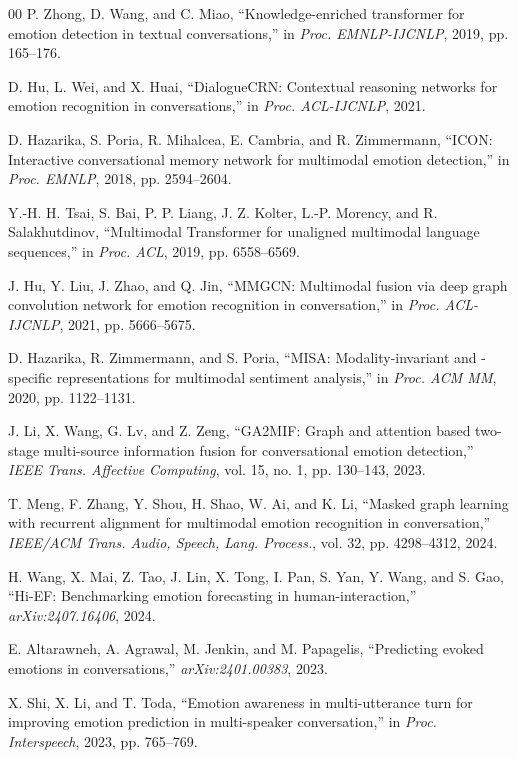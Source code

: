 \documentclass{ieeeaccess}
\begin{document}
\begin{thebibliography}{00}
 P. Zhong, D. Wang, and C. Miao, ``Knowledge-enriched transformer for emotion
detection in textual conversations,'' in \emph{Proc. EMNLP-IJCNLP}, 2019, pp. 165--176.

 D. Hu, L. Wei, and X. Huai, ``DialogueCRN: Contextual reasoning
networks for emotion recognition in conversations,'' in \emph{Proc. ACL-IJCNLP}, 2021.

 D. Hazarika, S. Poria, R. Mihalcea, E. Cambria, and R. Zimmermann,
``ICON: Interactive conversational memory network for multimodal emotion detection,'' in
\emph{Proc. EMNLP}, 2018, pp. 2594--2604.

 Y.-H. H. Tsai, S. Bai, P. P. Liang, J. Z. Kolter, L.-P. Morency, and R.
Salakhutdinov, ``Multimodal Transformer for unaligned multimodal language sequences,'' in
\emph{Proc. ACL}, 2019, pp. 6558--6569.

 J. Hu, Y. Liu, J. Zhao, and Q. Jin, ``MMGCN: Multimodal fusion via deep graph
convolution network for emotion recognition in conversation,'' in \emph{Proc. ACL-IJCNLP}, 2021,
pp. 5666--5675.

 D. Hazarika, R. Zimmermann, and S. Poria, ``MISA: Modality-invariant and
-specific representations for multimodal sentiment analysis,'' in \emph{Proc. ACM MM}, 2020, pp.
1122--1131.

 J. Li, X. Wang, G. Lv, and Z. Zeng, ``GA2MIF: Graph and attention based
two-stage multi-source information fusion for conversational emotion detection,'' \emph{IEEE
Trans. Affective Computing}, vol. 15, no. 1, pp. 130--143, 2023.

 T. Meng, F. Zhang, Y. Shou, H. Shao, W. Ai, and K. Li, ``Masked graph
learning with recurrent alignment for multimodal emotion recognition in conversation,''
\emph{IEEE/ACM Trans. Audio, Speech, Lang. Process.}, vol. 32, pp. 4298--4312, 2024.

 H. Wang, X. Mai, Z. Tao, J. Lin, X. Tong, I. Pan, S. Yan, Y. Wang, and S.
Gao, ``Hi-EF: Benchmarking emotion forecasting in human-interaction,'' \emph{arXiv:2407.16406},
2024.

 E. Altarawneh, A. Agrawal, M. Jenkin, and M. Papagelis, ``Predicting
evoked emotions in conversations,'' \emph{arXiv:2401.00383}, 2023.

 X. Shi, X. Li, and T. Toda, ``Emotion awareness in multi-utterance turn for
improving emotion prediction in multi-speaker conversation,'' in \emph{Proc. Interspeech}, 2023,
pp. 765--769.


\end{thebibliography}
\end{document}
